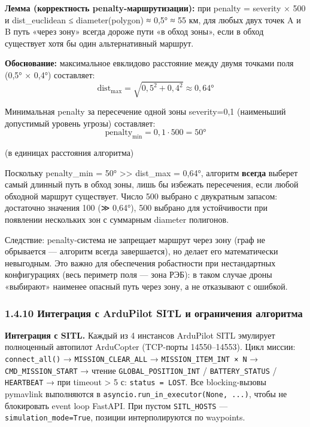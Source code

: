 \textbf{Лемма (корректность penalty-маршрутизации):} при penalty = severity × 500 и dist\_euclidean ≤ diameter(polygon) ≈ 0,5° ≈ 55 км, для любых двух точек A и B путь «через зону» всегда дороже пути «в обход зоны», если в обход существует хотя бы один альтернативный маршрут.

\textbf{Обоснование:} максимальное евклидово расстояние между двумя точками поля (0,5° × 0,4°) составляет: \[\mathrm{dist}_{\max} = \sqrt{0{,}5^2 + 0{,}4^2} \approx 0{,}64°\]

Минимальная penalty за пересечение одной зоны severity=0,1 (наименьший допустимый уровень угрозы) составляет: \[\mathrm{penalty}_{\min} = 0{,}1 \cdot 500 = 50°\]

(в единицах расстояния алгоритма)

Поскольку penalty\_min = 50° \textgreater\textgreater{} dist\_max = 0,64°, алгоритм \textbf{всегда} выберет самый длинный путь в обход зоны, лишь бы избежать пересечения, если любой обходной маршрут существует. Число 500 выбрано с двукратным запасом: достаточно значения 100 (≫ 0,64°), 500 выбрано для устойчивости при появлении нескольких зон с суммарным diameter полигонов.

Следствие: penalty-система не запрещает маршрут через зону (граф не обрывается --- алгоритм всегда завершается), но делает его математически невыгодным. Это важно для обеспечения робастности при нестандартных конфигурациях (весь периметр поля --- зона РЭБ): в таком случае дроны «выбирают» наименее опасный путь через зону, а не отказывают с ошибкой.

\hypertarget{ux438ux43dux442ux435ux433ux440ux430ux446ux438ux44f-ux441-ardupilot-sitl-ux438-ux43eux433ux440ux430ux43dux438ux447ux435ux43dux438ux44f-ux430ux43bux433ux43eux440ux438ux442ux43cux430}{%
\subsubsection{1.4.10 Интеграция с ArduPilot SITL и ограничения алгоритма}\label{ux438ux43dux442ux435ux433ux440ux430ux446ux438ux44f-ux441-ardupilot-sitl-ux438-ux43eux433ux440ux430ux43dux438ux447ux435ux43dux438ux44f-ux430ux43bux433ux43eux440ux438ux442ux43cux430}}

\textbf{Интеграция с SITL.} Каждый из 4 инстансов ArduPilot SITL эмулирует полноценный автопилот ArduCopter (TCP-порты 14550--14553). Цикл миссии: \texttt{connect\_all()} → \texttt{MISSION\_CLEAR\_ALL} → \texttt{MISSION\_ITEM\_INT\ ×\ N} → \texttt{CMD\_MISSION\_START} → чтение \texttt{GLOBAL\_POSITION\_INT} / \texttt{BATTERY\_STATUS} / \texttt{HEARTBEAT} → при timeout \textgreater{} 5 с: \texttt{status\ =\ LOST}. Все blocking-вызовы pymavlink выполняются в \texttt{asyncio.run\_in\_executor(None,\ ...)}, чтобы не блокировать event loop FastAPI. При пустом \texttt{SITL\_HOSTS} --- \texttt{simulation\_mode=True}, позиции интерполируются по waypoints.

